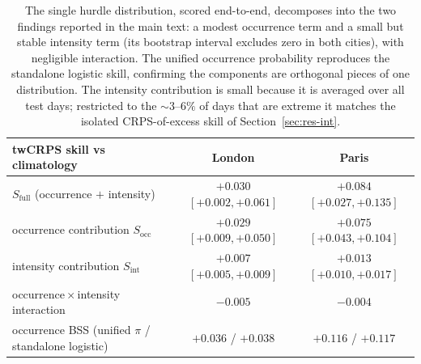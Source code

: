 \documentclass[11pt,a4paper]{article}
\begin{document}
\clearpage
\begin{table}[ht]
\centering
\small
\caption{The single hurdle distribution, scored end-to-end, decomposes into the
two findings reported in the main text: a modest occurrence term and a small but
stable intensity term (its bootstrap interval excludes zero in both cities), with
negligible interaction. The unified occurrence probability reproduces the
standalone logistic skill, confirming the components are orthogonal pieces of one
distribution. The intensity contribution is small because it is averaged over all
test days; restricted to the $\sim\!3$--$6\%$ of days that are extreme it matches
the isolated CRPS-of-excess skill of Section~\ref{sec:res-int}.}
\label{tab:unified}
\setlength{\tabcolsep}{4.5pt}
\begin{tabular}{lcc}
\toprule
twCRPS skill vs climatology & London & Paris \\
\midrule
$S_{\mathrm{full}}$ (occurrence $+$ intensity) & $+0.030$ $[+0.002,+0.061]$ & $+0.084$ $[+0.027,+0.135]$ \\
\quad occurrence contribution $S_{\mathrm{occ}}$ & $+0.029$ $[+0.009,+0.050]$ & $+0.075$ $[+0.043,+0.104]$ \\
\quad intensity contribution $S_{\mathrm{int}}$ & $+0.007$ $[+0.005,+0.009]$ & $+0.013$ $[+0.010,+0.017]$ \\
\quad occurrence\,$\times$\,intensity interaction & $-0.005$ & $-0.004$ \\
\midrule
occurrence BSS (unified $\pi$ / standalone logistic) & $+0.036$ / $+0.038$ & $+0.116$ / $+0.117$ \\
\bottomrule
\end{tabular}
\end{table}\clearpage
\end{document}
